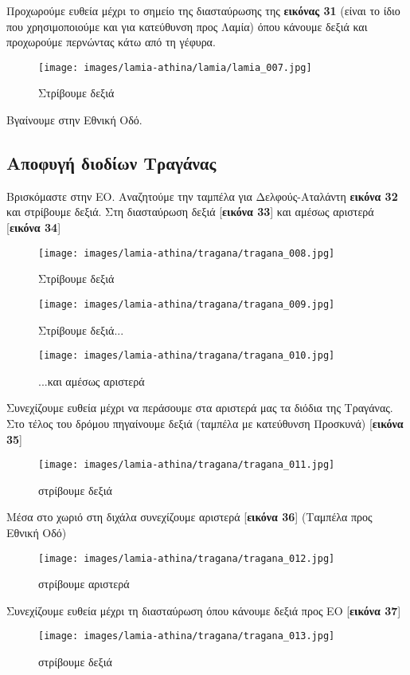 Προχωρούμε ευθεία μέχρι το σημείο της διασταύρωσης της \textbf{εικόνας 31} (είναι το ίδιο που χρησιμοποιούμε και για κατεύθυνση προς Λαμία) όπου κάνουμε δεξιά και προχωρούμε περνώντας κάτω από τη γέφυρα. 
\begin{figure}[H]
\texttt{[image: images/lamia-athina/lamia/lamia\_007.jpg]}
\caption{Στρίβουμε δεξιά} 
\end{figure}


Βγαίνουμε στην Εθνική Οδό.

\newpage
\begin{center}
\section*{Αποφυγή διοδίων Τραγάνας}
\end{center}
Βρισκόμαστε στην ΕΟ. Αναζητούμε την ταμπέλα για Δελφούς-Αταλάντη \textbf{εικόνα 32} και στρίβουμε δεξιά. Στη διασταύρωση δεξιά [\textbf{εικόνα 33}] και αμέσως αριστερά [\textbf{εικόνα 34}]
\begin{figure}[H]
\texttt{[image: images/lamia-athina/tragana/tragana\_008.jpg]}
\caption{Στρίβουμε δεξιά}
\texttt{[image: images/lamia-athina/tragana/tragana\_009.jpg]} 
\caption{Στρίβουμε δεξιά...}
\end{figure}
\begin{figure}[H]
\texttt{[image: images/lamia-athina/tragana/tragana\_010.jpg]} 
\caption{...και αμέσως αριστερά}
\end{figure}
Συνεχίζουμε ευθεία μέχρι να περάσουμε στα αριστερά μας τα διόδια της Τραγάνας. Στο τέλος του δρόμου πηγαίνουμε δεξιά (ταμπέλα με κατεύθυνση Προσκυνά) [\textbf{εικόνα 35}]
\begin{figure}[H]
\texttt{[image: images/lamia-athina/tragana/tragana\_011.jpg]} 
\caption{στρίβουμε δεξιά}
\end{figure}
Μέσα στο χωριό στη διχάλα συνεχίζουμε αριστερά [\textbf{εικόνα 36}] (Ταμπέλα προς Εθνική Οδό)
\begin{figure}[H]
\texttt{[image: images/lamia-athina/tragana/tragana\_012.jpg]} 
\caption{στρίβουμε αριστερά}
\end{figure}
Συνεχίζουμε ευθεία μέχρι τη διασταύρωση όπου κάνουμε δεξιά προς ΕΟ [\textbf{εικόνα 37}]
\begin{figure}[H]
\texttt{[image: images/lamia-athina/tragana/tragana\_013.jpg]} 
\caption{στρίβουμε δεξιά}
\end{figure}
